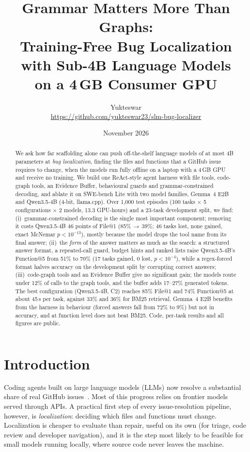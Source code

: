 \documentclass[11pt]{article}
\title{\textbf{Grammar Matters More Than Graphs:\\ Training-Free Bug Localization with Sub-4B Language Models\\ on a 4\,GB Consumer GPU}}
\author{Yukteswar\\[2pt]
  \small\url{https://github.com/yukteswar23/slm-bug-localizer}}
\date{November 2026}
\makeatletter
\newcommand{\Gm}{Gemma~4 E2B}
\newcommand{\Qw}{Qwen3.5-4B}
\newcommand{\fileone}{File@1}
\newcommand{\funcfive}{Function@5}
\makeatother
\begin{document}
\maketitle
\thispagestyle{fancy}

\begin{abstract}
\noindent
We ask how far scaffolding alone can push off-the-shelf language models of at most 4B parameters at \emph{bug localization}, finding the files and functions that a GitHub issue requires to change, when the models run fully offline on a laptop with a 4\,GB GPU and receive no training.
We build one ReAct-style agent harness with file tools, code-graph tools, an Evidence Buffer, behavioural guards and grammar-constrained decoding, and ablate it on SWE-bench Lite with two model families, \Gm{} and \Qw{} (4-bit, llama.cpp).
Over 1{,}000 test episodes (100 tasks $\times$ 5 configurations $\times$ 2 models, 13.3 GPU-hours) and a 23-task development split, we find:
(i)~grammar-constrained decoding is the single most important component; removing it costs \Qw{} 46 points of \fileone{} (85\%\,$\to$\,39\%; 46 tasks lost, none gained, exact McNemar $p<10^{-13}$), mostly because the model drops the tool name from its final answer;
(ii)~the \emph{form} of the answer matters as much as the search: a structured answer format, a repeated-call guard, budget hints and ranked lists raise \Qw{}'s \funcfive{} from 51\% to 70\% (17 tasks gained, 0 lost, $p<10^{-4}$), while a regex-forced format halves accuracy on the development split by corrupting correct answers;
(iii)~code-graph tools and an Evidence Buffer give no significant gain; the models route under 12\% of calls to the graph tools, and the buffer adds 17--27\% generated tokens.
The best configuration (\Qw{}, C2) reaches 85\% \fileone{} and 74\% \funcfive{} at about 45\,s per task, against 33\% and 36\% for BM25 retrieval.
\Gm{} benefits from the harness in behaviour (forced answers fall from 72\% to 9\%) but not in accuracy, and at function level does not beat BM25.
Code, per-task results and all figures are public.
\end{abstract}

\section{Introduction}
\label{sec:intro}

Coding agents built on large language models (LLMs) now resolve a substantial share of real GitHub issues~\cite{jimenez2024swebench,yang2024sweagent,xia2024agentless}.
Most of this progress relies on frontier models served through APIs.
A practical first step of every issue-resolution pipeline, however, is \emph{localization}: deciding which files and functions must change.
Localization is cheaper to evaluate than repair, useful on its own (for triage, code review and developer navigation), and it is the step most likely to be feasible for small models running locally, where source code never leaves the machine.
\end{document}
